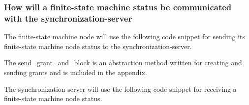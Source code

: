 \hypertarget{how-will-a-finite-state-machine-status-be-communicated-with-the-synchronization-server}{%
\subsubsection{How will a finite-state machine status be communicated
with the
synchronization-server}\label{how-will-a-finite-state-machine-status-be-communicated-with-the-synchronization-server}}

The finite-state machine node will use the following code snippet for
sending its finite-state machine node status to the
synchronization-server.

\begin{Shaded}
\begin{Highlighting}[]
\NormalTok{\{}


\NormalTok{\}}
\end{Highlighting}
\end{Shaded}

The send\_grant\_and\_block is an abstraction method written for
creating and sending grants and is included in the appendix.

The synchronization-server will use the following code snippet for
receiving a finite-state machine node status.

\begin{Shaded}
\begin{Highlighting}[]
\NormalTok{\{}




\NormalTok{    \{}
\NormalTok{    \}}
\NormalTok{    \{}
\NormalTok{    \}}
\NormalTok{\}}
\end{Highlighting}
\end{Shaded}

